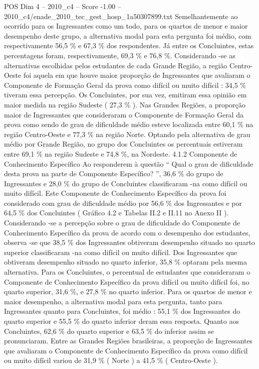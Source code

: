 \begin{textsample}{POS Dim 4 – 2010\_c4 – Score -1.00 – 2010\_c4/enade\_2010\_tec\_gest\_hosp\_1a50307899.txt}
Semelhantemente ao ocorrido para os Ingressantes como um todo, para os quartos de menor e maior desempenho deste grupo, a alternativa modal para esta pergunta foi médio, com respectivamente 56,5 \% e 67,3 \% dos respondentes.
Já entre os Concluintes, estas percentagens foram, respectivamente, 69,3 \% e 76,8 \%.
Considerando -se as alternativas escolhidas pelos estudantes de cada Grande Região, a região Centro-Oeste foi aquela em que houve maior proporção de Ingressantes que avaliaram o Componente de Formação Geral da prova como difícil ou muito difícil : 34,5 \% tiveram essa percepção.
Os Concluintes, por sua vez, emitiram essa opinião em maior medida na região Sudeste ( 27,3 \% ).
Nas Grandes Regiões, a proporção maior de Ingressantes que consideraram o Componente de Formação Geral da prova como sendo de grau de dificuldade médio esteve localizada entre 60,1 \% na região Centro-Oeste e 77,3 \% na região Norte.
Optando pela alternativa de grau médio por Grande Região, no grupo dos Concluintes os percentuais estiveram entre 69,1 \% na região Sudeste e 74,8 \%, na Nordeste. 4.1.2 Componente de Conhecimento Específico Ao responderem à questão “ Qual o grau de dificuldade desta prova na parte de Componente Específico? ”, 36,6 \% do grupo de Ingressantes e 28,0 \% do grupo de Concluintes classificaram -na como difícil ou muito difícil.
Este Componente de Conhecimento Específico da prova foi considerado com grau de dificuldade médio por 56,6 \% dos Ingressantes e por 64,5 \% dos Concluintes ( Gráfico 4.2 e Tabelas II.2 e II.11 no Anexo II ).
Considerando -se a percepção sobre o grau de dificuldade do Componente de Conhecimento Específico da prova de acordo com o desempenho dos estudantes, observa -se que 38,5 \% dos Ingressantes obtiveram desempenho situado no quarto superior classificaram -na como difícil ou muito difícil.
Dos Ingressantes que obtiveram desempenho situado no quarto inferior, 35,8 \% optaram pela mesma alternativa.
Para os Concluintes, o percentual de estudantes que consideraram o Componente de Conhecimento Específico da prova difícil ou muito difícil foi, no quarto superior, 31,6 \%, e 27,8 \% no quarto inferior.
Para os quartos de menor e maior desempenho, a alternativa modal para esta pergunta, tanto para Ingressantes quanto para Concluintes, foi médio : 55,1 \% dos Ingressantes do quarto superior e 55,5 \% do quarto inferior deram essa resposta.
Quanto aos Concluintes, 62,6 \% do quarto superior e 63,5 \% do inferior assim se pronunciaram.
Entre as Grandes Regiões brasileiras, a proporção de Ingressantes que avaliaram o Componente de Conhecimento Específico da prova como difícil ou muito difícil variou de 31,9 \% ( Norte ) a 41,5 \% ( Centro-Oeste ).

\end{textsample}
